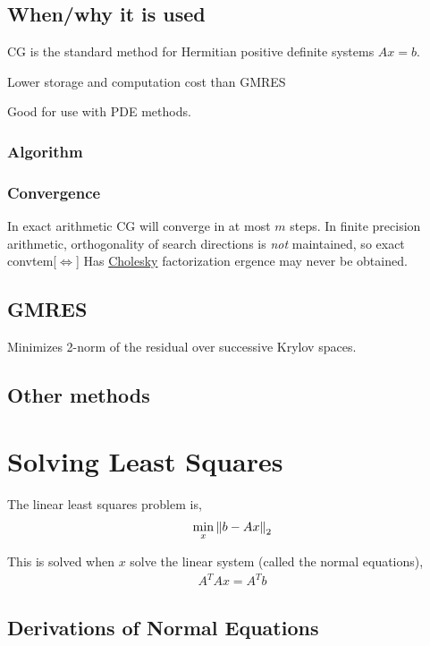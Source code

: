 \documentclass[12pt]{article}
\begin{document}
\subsection{When/why it is used}
CG is the standard method for Hermitian positive definite systems \( Ax = b \). 

Lower storage and computation cost than GMRES

Good for use with PDE methods.

\subsubsection{Algorithm}


\subsubsection{Convergence}
In exact arithmetic CG will converge in at most \( m \) steps. In finite precision arithmetic, orthogonality of search directions is \textit{not} maintained, so exact convtem[\(\Leftrightarrow\)] Has \hyperref[sec:cholesky]{Cholesky} factorization
ergence may never be obtained.



\subsection{GMRES}
Minimizes 2-norm of the residual over successive Krylov spaces.

\subsection{Other methods}

\pagebreak
\section{Solving Least Squares}
The linear least squares problem is,
\begin{align*}
    \min_{x} \left\lVert b-Ax\right\rVert_2
\end{align*}

This is solved when \( x \) solve the linear system (called the normal equations),
\begin{align*}
    A^TAx = A^Tb
\end{align*}


\subsection{Derivations of Normal Equations}
\end{document}
